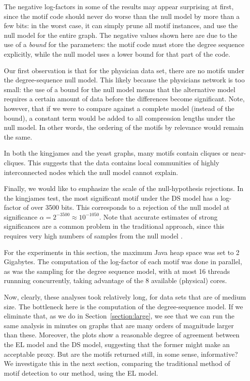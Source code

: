 \documentclass[twoside,11pt]{article}
\begin{document}
The negative log-factors in some of the results may appear surprising at first, since the motif code should never do worse than the null model by more than a few bits: in the worst case, it can simply prune all motif instances, and use the null model for the entire graph. The negative values shown here are due to the use of a \emph{bound} for the parameters: the motif code must store the degree sequence explicitly, while the null model uses a lower bound for that part of the code.

Our first observation is that for the physician data set, there are no motifs under the degree-sequence null model. This likely because the physicians network is too small: the use of a bound for the null model means that the alternative model requires a certain amount of data before the differences become significant. Note, however, that if we were to compare against a complete model (instead of the bound), a constant term would be added to all compression lengths under the null model. In other words, the ordering of the motifs by relevance would remain the same.

In both the kingjames and the yeast graphs, many motifs contain cliques or near-cliques. This suggests that the data contains local communities of highly interconnected nodes which the null model cannot explain.

Finally, we would like to emphasize the scale of the null-hypothesis rejections. In the kingjames test, the most significant motif under the DS model has a log-factor of over 3500 bits. This corresponds to a rejection of the null model at significance $\alpha = 2^{-3500} \approx 10^{-1050}$. Note that accurate estimates of strong significances are a common problem in the traditional approach, since this requires very high numbers of samples from the null model \citep{picard2008assessing}.

For the experiments in this section, the maximum Java heap space was set to 2 Gigabytes. The computation of the log-factor of each motif was done in parallel, as was the sampling for the degree sequence model, with at most 16 threads runnning concurrently, taking advantage of the 8 available (physical) cores. 

Now, clearly, these analyses took relatively long, for data sets that are of medium size. The bottleneck here is the computation of the degree-sequence model. If we eliminate that, as we do in Section~\ref{section:large}, we see that we can run the same analysis in minutes on graphs that are many orders of magnitude larger than these. Moreover, the plots show a reasonable degree of agreement between the EL model and the DS model, suggesting that the former might make an acceptable proxy. But are the motifs returned still, in some sense, informative? We investigate this in the next section, comparing the traditional method of motif detection to our method, using the EL model. 
\end{document}
